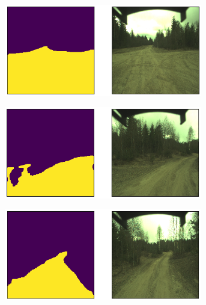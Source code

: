 \documentclass[USenglish]{ifimaster}  %
\begin{document}
\begin{appendices}
\begin{figure}[ht]
\centering
\begin{subfigure}[b]{\textwidth}
\centering
\includegraphics[width=0.95\textwidth]{bilder/appendix_1/2017-05-09-13-26-47-00401.png}
\end{subfigure}
\hfill
\begin{subfigure}[b]{\textwidth}
\centering
\includegraphics[width=0.95\textwidth]{bilder/appendix_1/2017-05-09-13-26-47-00417.png}
\end{subfigure}
\hfill
\begin{subfigure}[b]{\textwidth}
\centering
\includegraphics[width=0.95\textwidth]{bilder/appendix_1/2017-05-09-13-26-47-00427.png}
\end{subfigure}
\end{figure}


\end{appendices}
\end{document}
